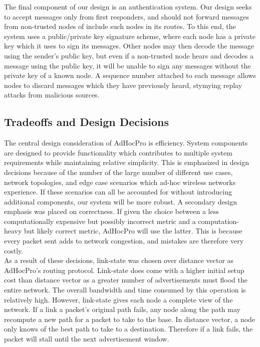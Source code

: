 \documentclass[letterpaper]{article}
\begin{document}
\noindent The final component of our design is an authentication system. Our design seeks to accept messages
only from first responders, and should not forward messages from non-trusted nodes of include such nodes in
its routes. To this end, the system uses a public/private key signature scheme, where each node has a private
key which it uses to sign its messages. Other nodes may then decode the message using the sender's
public key, but even if a non-trusted node hears and decodes a message using the public key, it will be 
unable to sign any messages without the private key of a known node. A sequence number attached to each
message allows nodes to discard messages which they have previously heard, stymying replay attacks from
malicious sources.

\subsection{Tradeoffs and Design Decisions}

The central design consideration of AdHocPro is efficiency. System components are designed to provide
functionality which contributes to multiple system requirements while maintaining relative simplicity.
This is emphasized in design decisions because of the number of the large number of different use cases,
network topologies, and edge case scenarios which ad-hoc wireless networks experience. If these scenarios
can all be accounted for without introducing additional components, our system will be more robust. A 
secondary design emphasis was placed on correctness. If given the choice between a less computationally
expensive but possibly incorrect metric and a computation-heavy but likely correct metric, AdHocPro will
use the latter. This is because every packet sent adds to network congestion, and mistakes are therefore
very costly.
\\

\noindent As a result of these decisions, link-state was chosen over distance vector as AdHocPro's routing
protocol. Link-state does come with a higher initial setup cost than distance vector as a greater number of
advertisements must flood the entire network. The overall bandwidth and time consumed by this operation
is relatively high. However, link-state gives each node a complete view of the network. If a link a packet's
original path fails, any node along the path may recompute a new path for a packet to take to the base. In
distance vector, a node only knows of the best path to take to a destination. Therefore if a link fails, the
packet will stall until the next advertisement window.
\\
\end{document}
